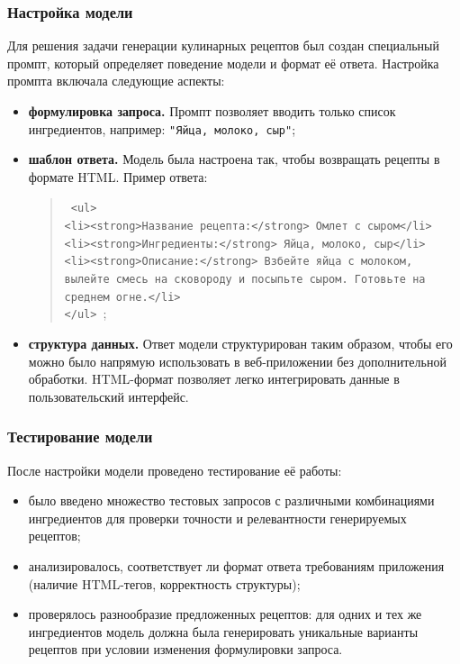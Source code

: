 {{\subsubsection*{Настройка модели}
Для решения задачи генерации кулинарных рецептов был создан специальный промпт, который определяет поведение модели и формат её ответа. Настройка промпта включала следующие аспекты:
\begin{itemize}
    \item \textbf{формулировка запроса.} Промпт позволяет вводить только список ингредиентов, например: \texttt{"Яйца, молоко, сыр"};
    \item \textbf{шаблон ответа.} Модель была настроена так, чтобы возвращать рецепты в формате HTML. Пример ответа:
    \begin{quote}
        \texttt{
    <ul> \\
        <li><strong>Название рецепта:</strong> Омлет с сыром</li> \\
        <li><strong>Ингредиенты:</strong> Яйца, молоко, сыр</li> \\
        <li><strong>Описание:</strong> Взбейте яйца с молоком, \\
            вылейте смесь на сковороду и посыпьте сыром. Готовьте на \\
            среднем огне.</li> \\
    </ul>
        };
        \end{quote}
    \item \textbf{структура данных.} Ответ модели структурирован таким образом, чтобы его можно было напрямую использовать в веб-приложении без дополнительной обработки. HTML-формат позволяет легко интегрировать данные в пользовательский интерфейс.
\end{itemize}

\subsubsection*{Тестирование модели}
После настройки модели проведено тестирование её работы:
\begin{itemize}
    \item было введено множество тестовых запросов с различными комбинациями ингредиентов для проверки точности и релевантности генерируемых рецептов;
    \item анализировалось, соответствует ли формат ответа требованиям приложения (наличие HTML-тегов, корректность структуры);
    \item проверялось разнообразие предложенных рецептов: для одних и тех же ингредиентов модель должна была генерировать уникальные варианты рецептов при условии изменения формулировки запроса.
\end{itemize}

}}
